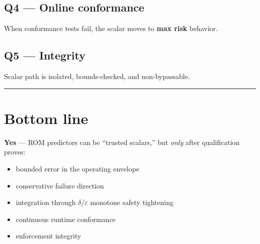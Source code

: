 \documentclass[11pt,a4paper]{article}
\begin{document}
\subsection*{\textbf{Q4 — Online conformance}}

When conformance tests fail, the scalar moves to \textbf{max risk} behavior.

\subsection*{\textbf{Q5 — Integrity}}

Scalar path is isolated, bounds-checked, and non-bypassable.

\hrule
\vspace{0.75em}

\section*{Bottom line}

\textbf{Yes} — ROM predictors can be ``trusted scalars,'' but \textit{only} after qualification proves:

\begin{itemize}
\item bounded error in the operating envelope
\item conservative failure direction
\item integration through $\delta/\varepsilon$ monotone safety tightening
\item continuous runtime conformance
\item enforcement integrity
\end{itemize}
\end{document}
